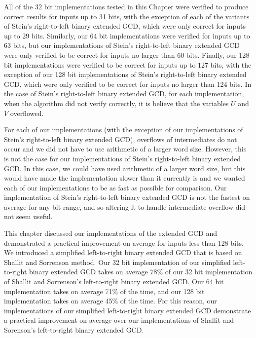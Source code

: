 \documentclass{ucalgthes1}
\theoremstyle{definition}
\begin{document}
All of the 32 bit implementations tested in this Chapter were verified to produce correct results for inputs up to 31 bits, with the exception of each of the variants of Stein's right-to-left binary extended GCD, which were only correct for inputs up to 29 bits.  Similarly, our 64 bit implementations were verified for inputs up to 63 bits, but our implementations of Stein's right-to-left binary extended GCD were only verified to be correct for inputs no larger than 60 bits.  Finally, our 128 bit implementations were verified to be correct for inputs up to 127 bits, with the exception of our 128 bit implementations of Stein's right-to-left binary extended GCD, which were only verified to be correct for inputs no larger than 124 bits.  In the case of Stein's right-to-left binary extended GCD, for each implementation, when the algorithm did not verify correctly, it is believe that the variables $U$ and $V$ overflowed.

For each of our implementations (with the exception of our implementations of Stein's right-to-left binary extended GCD), overflows of intermediates do not occur and we did not have to use arithmetic of a larger word size.  However, this is not the case for our implementations of Stein's right-to-left binary extended GCD.  In this case, we could have used arithmetic of a larger word size, but this would have made the implementation slower than it currently is and we wanted each of our implementations to be as fast as possible for comparison.  Our implementation of Stein's right-to-left binary extended GCD is not the fastest on average for any bit range, and so altering it to handle intermediate overflow did not seem useful.

This chapter discussed our implementations of the extended GCD and demonstrated a practical improvement on average for inputs less than 128 bits.   We introduced a simplified left-to-right binary extended GCD that is based on Shallit and Sorrenson \cite{Shallit1994} method.  Our 32 bit implementation of our simplified left-to-right binary extended GCD takes on average 78\% of our 32 bit implementation of Shallit and Sorrenson's left-to-right binary extended GCD.   Our 64 bit implementation takes on average 71\% of the time, and our 128 bit implementation takes on average 45\% of the time.  For this reason, our implementations of our simplified left-to-right binary extended GCD demonstrate a practical improvement on average over our implementations of Shallit and Sorenson's left-to-right binary extended GCD.
\end{document}
